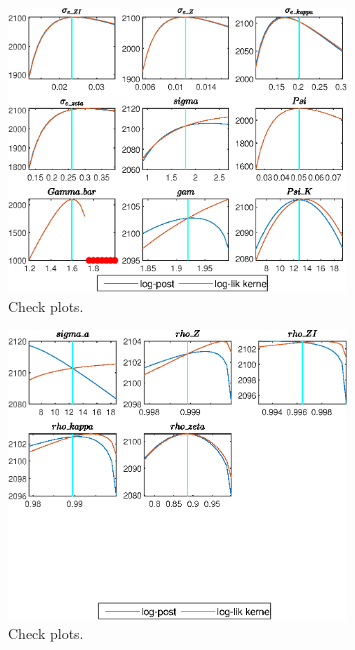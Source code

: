  
\begin{figure}[H]
\centering 
\includegraphics[width=0.80\textwidth]{directed_search_simp_est/graphs/directed_search_simp_est_CheckPlots1}
\caption{Check plots.}\label{Fig:CheckPlots:1}
\end{figure}
 
\begin{figure}[H]
\centering 
\includegraphics[width=0.80\textwidth]{directed_search_simp_est/graphs/directed_search_simp_est_CheckPlots2}
\caption{Check plots.}\label{Fig:CheckPlots:2}
\end{figure}
 
